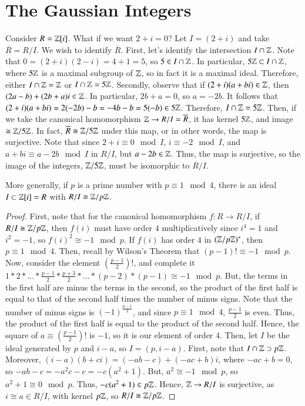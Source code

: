 \section{ The Gaussian Integers}

\begin{example}
        Consider $R = \mathbb Z[i]$. What if we want $2+i = 0$? Let $I = (2+i)$ and take $\overline{R} = R/I$. We wish to identify $\overline{R}$. First, let's identify the intersection $I \cap \mathbb Z$. Note that $0 = (2+i)(2-i) = 4+1 = 5$, so $5 \in I\cap \mathbb Z$. In particular, $5\mathbb Z \subset I\cap \mathbb Z$, where $5\mathbb Z$ is a maximal subgroup of $\mathbb Z$, so in fact it is a maximal ideal. Therefore, either $I\cap \mathbb Z = \mathbb Z$ or $I\cap \mathbb Z = 5\mathbb Z$. Secondly, observe that if $(2+i)(a+bi) \in \mathbb Z$, then $(2a-b)+(2b+a)i \in \mathbb Z$. In particular, $2b+a = 0$, so $a = -2b$. It follows that $(2+i)(a+bi) = 2(-2b)-b = -4b - b = 5(-b) \in 5\mathbb Z$. Therefore, $I\cap \mathbb Z = 5\mathbb Z$. Then, if we take the canonical homomorphism $\mathbb Z\rightarrow R/I = \overline{R}$, it has kernel $5\mathbb Z$, and image $\cong \mathbb Z/5\mathbb Z$. In fact, $\overline{R} \cong \mathbb Z/5\mathbb Z$ under this map, or in other words, the map is surjective. Note that since $2+i \equiv 0 \mod I$, $i \equiv -2 \mod I$, and $a+bi \equiv a-2b \mod I$ in $R/I$, but $a-2b \in \mathbb Z$. Thus, the map is surjective, so the image of the integers, $\mathbb Z/5\mathbb Z$, must be isomorphic to $R/I$.
\end{example}

\begin{theorem}
        More generally, if $p$ is a prime number with $p\equiv 1 \mod 4$, there is an ideal $I \subset \mathbb Z[i]=R$ with $R/I \cong \mathbb Z/p\mathbb Z$.
\end{theorem}
\begin{proof}
        First, note that for the canonical homomorphism $f:R\rightarrow R/I$, if $R/I \cong \mathbb Z/p\mathbb Z$, then $f(i)$ must have order $4$ multiplicatively since $i^4 = 1$ and $i^2 = -1$, so $f(i)^2 \cong -1 \mod p$. If $f(i)$ has order $4$ in $(\mathbb Z/p\mathbb Z)^*$, then $p \equiv 1 \mod 4$. Then, recall by Wilson's Theorem that $(p-1)! \equiv -1 \mod p$. Now, consider the element $\left(\frac{p-1}{2}\right)!$, and complete it $1*2*...*\frac{p-1}{2}*\frac{p+3}{2}*...*(p-2)*(p-1) \cong -1 \mod p$. But, the terms in the first half are minus the terms in the second, so the product of the first half is equal to that of the second half times the number of minus signs. Note that the number of minus signs is $(-1)^{\frac{p-1}{2}}$, and since $p \equiv 1 \mod 4$, $\frac{p-1}{2}$ is even. Thus, the product of the first half is equal to the product of the second half. Hence, the square of $a\equiv\left(\frac{p-1}{2}\right)!$ is $-1$, so it is our element of order $4$. Then, let $I$ be the ideal generated by $p$ and $i-a$, so $I = (p,i-a)$. First, note that $I\cap \mathbb Z \supset p\mathbb Z$. Moreover, $(i-a)(b+ci) = (-ab-c)+(-ac+b)i$, where $-ac +b = 0$, so $-ab-c = -a^2c-c = -c(a^2+1)$. But, $a^2 \cong -1 \mod p$, so $a^2 + 1 \cong 0 \mod p$. Thus, $-c(a^2+1) \in p\mathbb Z$. Hence, $\mathbb Z\rightarrow R/I$ is surjective, as $i\cong a \in R/I$, with kernel $p\mathbb Z$, so $R/I\cong \mathbb Z/p\mathbb Z$.
\end{proof}


